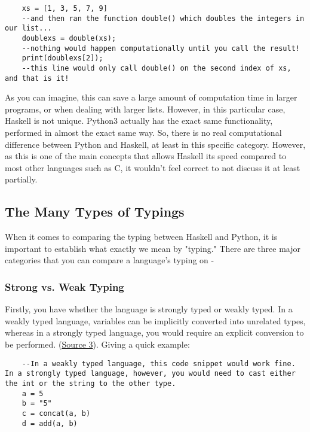 \documentclass{article}
\begin{document}
    \begin{lstlisting}
    xs = [1, 3, 5, 7, 9]
    --and then ran the function double() which doubles the integers in our list...
    doublexs = double(xs);
    --nothing would happen computationally until you call the result!
    print(doublexs[2]);
    --this line would only call double() on the second index of xs, and that is it! 
    \end{lstlisting}

    \medskip\noindent As you can imagine, this can save a large amount of computation time in larger programs, or when dealing with larger lists. However, in this particular case, Haskell is not unique. Python3 actually has the exact same functionality, performed in almost the exact same way. So, there is no real computational difference between Python and Haskell, at least in this specific category. However, as this is one of the main concepts that allows Haskell its speed compared to most other languages such as C, it wouldn't feel correct to not discuss it at least partially. 

    \subsection{The Many Types of Typings}
	
    When it comes to comparing the typing between Haskell and Python, it is important to establish what exactly we mean by "typing." There are three major categories that you can compare a language's typing on - 
    \subsubsection{Strong vs. Weak Typing}
    Firstly, you have whether the language is strongly typed or weakly typed. In a weakly typed language, variables can be implicitly converted into unrelated types, whereas in a strongly typed language, you would require an explicit conversion to be performed. (\href{https://pythonconquerstheuniverse.wordpress.com/2009/10/03/static-vs-dynamic-typing-of-programming-languages/} {Source 3}). Giving a quick example:
    
    \begin{lstlisting}
    --In a weakly typed language, this code snippet would work fine. In a strongly typed language, however, you would need to cast either the int or the string to the other type. 
    a = 5
    b = "5"
    c = concat(a, b)
    d = add(a, b)
    \end{lstlisting}
    
\end{document}
